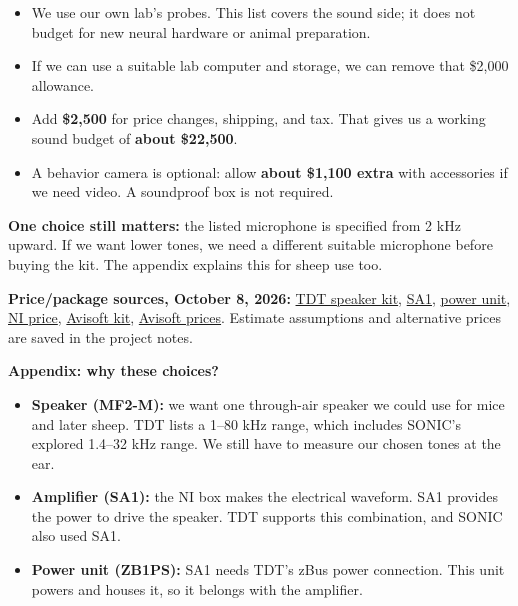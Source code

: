 \documentclass[12pt,letterpaper]{article}
\newcommand{\topic}[1]{\vspace{7pt}{\large\bfseries #1}\par}
\begin{document}
\topic{What we can reuse from the lab}
\begin{itemize}
\item We use our own lab's probes. This list covers the sound side; it does not budget for new neural hardware or animal preparation.
\item If we can use a suitable lab computer and storage, we can remove that \$2,000 allowance.
\end{itemize}

\topic{A little room in the budget}
\begin{itemize}
\item Add \textbf{\$2,500} for price changes, shipping, and tax. That gives us a working sound budget of \textbf{about \$22,500}.
\item A behavior camera is optional: allow \textbf{about \$1,100 extra} with accessories if we need video. A soundproof box is not required.
\end{itemize}

{\small\color{muted}\textbf{One choice still matters:} the listed microphone is specified from 2 kHz upward. If we want lower tones, we need a different suitable microphone before buying the kit. The appendix explains this for sheep use too.}

{\footnotesize\color{muted}\textbf{Price/package sources, October 8, 2026:} \href{https://www.tdt.com/docs/hardware/mf2-multi-field-magnetic-speakers/}{TDT speaker kit}, \href{https://www.tdt.com/docs/hardware/sa1-stereo-amplifier/}{SA1}, \href{https://www.tdt.com/docs/hardware/zb1ps-powered-zbus-device-chassis/}{power unit}, \href{https://www.newark.com/ni-now-part-of-emerson/781442-01/multifunction-i-o-device-usb-6361/dp/14AJ5341}{NI price}, \href{https://avisoft.com/ultrasoundgate/116hm/}{Avisoft kit}, \href{https://avisoft.com/price-list-ordering-information/}{Avisoft prices}. Estimate assumptions and alternative prices are saved in the project notes.}

\newpage
{\LARGE\bfseries Appendix: why these choices?}\par

\topic{The speaker and the two parts it needs}
\begin{itemize}
\item \textbf{Speaker (MF2-M):} we want one through-air speaker we could use for mice and later sheep. TDT lists a 1--80 kHz range, which includes SONIC's explored 1.4--32 kHz range. We still have to measure our chosen tones at the ear.
\item \textbf{Amplifier (SA1):} the NI box makes the electrical waveform. SA1 provides the power to drive the speaker. TDT supports this combination, and SONIC also used SA1.
\item \textbf{Power unit (ZB1PS):} SA1 needs TDT's zBus power connection. This unit powers and houses it, so it belongs with the amplifier.
\end{itemize}
\end{document}
